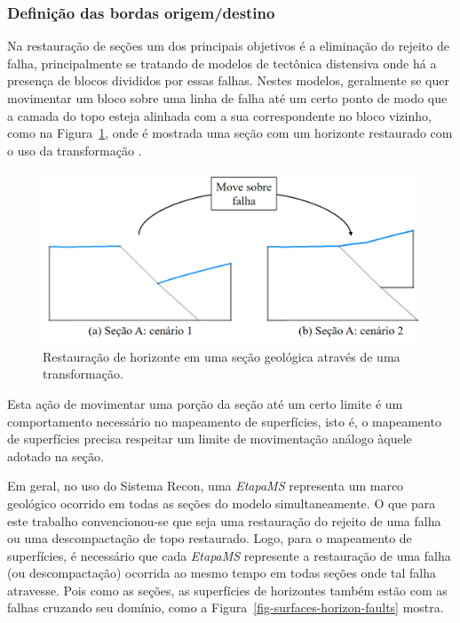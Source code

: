 \subsubsection{Definição das bordas origem/destino}

Na restauração de seções um dos principais objetivos é a eliminação do rejeito de falha, principalmente se tratando de modelos de tectônica distensiva onde há a presença de blocos divididos por essas falhas\cite{Santi}. Nestes modelos, geralmente se quer movimentar um bloco sobre uma linha de falha até um certo ponto de modo que a camada do topo esteja alinhada com a sua correspondente no bloco vizinho, como na Figura~\ref{fig-section-horizon-restored}, onde é mostrada uma seção com um horizonte restaurado com o uso da transformação .

\begin{figure} [H]
  \begin{center}
    \includegraphics[width=350pt]{images/fig-section-horizon-restored}
    \caption{Restauração de horizonte em uma seção geológica através de uma transformação.}\label{fig-section-horizon-restored}
  \end{center}
\end{figure}

Esta ação de movimentar uma porção da seção até um certo limite é um comportamento necessário no mapeamento de superfícies, isto é, o mapeamento de superfícies precisa respeitar um limite de movimentação análogo àquele adotado na seção.

Em geral, no uso do Sistema Recon, uma \textit{EtapaMS} representa um marco geológico ocorrido em todas as seções do modelo simultaneamente. O que para este trabalho convencionou-se que seja uma restauração do rejeito de uma falha ou uma descompactação de topo restaurado. Logo, para o mapeamento de superfícies, é necessário que cada \textit{EtapaMS} represente a restauração de uma falha (ou descompactação) ocorrida ao mesmo tempo em todas seções onde tal falha atravesse. Pois como as seções, as superfícies de horizontes também estão com as falhas cruzando seu domínio, como a Figura~\ref{fig-surfaces-horizon-faults} mostra.

